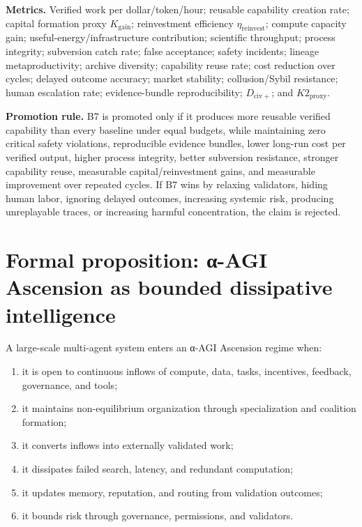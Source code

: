 \documentclass[11pt]{article}
\providecommand{\tightlist}{\setlength{\itemsep}{0pt}\setlength{\parskip}{0pt}}
\begin{document}
\textbf{Metrics.} Verified work per dollar/token/hour; reusable capability creation rate; capital formation proxy \(K_{\mathrm{gain}}\); reinvestment efficiency \(\eta_{\mathrm{reinvest}}\); compute capacity gain; useful-energy/infrastructure contribution; scientific throughput; process integrity; subversion catch rate; false acceptance; safety incidents; lineage metaproductivity; archive diversity; capability reuse rate; cost reduction over cycles; delayed outcome accuracy; market stability; collusion/Sybil resistance; human escalation rate; evidence-bundle reproducibility; \(D_{\mathrm{civ}+}\); and \(K2_{\mathrm{proxy}}\).

\textbf{Promotion rule.} B7 is promoted only if it produces more reusable verified capability than every baseline under equal budgets, while maintaining zero critical safety violations, reproducible evidence bundles, lower long-run cost per verified output, higher process integrity, better subversion resistance, stronger capability reuse, measurable capital/reinvestment gains, and measurable improvement over repeated cycles. If B7 wins by relaxing validators, hiding human labor, ignoring delayed outcomes, increasing systemic risk, producing unreplayable traces, or increasing harmful concentration, the claim is rejected.

\section{Formal proposition: α-AGI Ascension as bounded dissipative intelligence}\label{formal-proposition-ux3b1-agi-ascension-as-bounded-dissipative-intelligence}

A large-scale multi-agent system enters an α-AGI Ascension regime when:

\begin{enumerate}
\def\labelenumi{\arabic{enumi}.}
\tightlist
\item
  it is open to continuous inflows of compute, data, tasks, incentives, feedback, governance, and tools;
\item
  it maintains non-equilibrium organization through specialization and coalition formation;
\item
  it converts inflows into externally validated work;
\item
  it dissipates failed search, latency, and redundant computation;
\item
  it updates memory, reputation, and routing from validation outcomes;
\item
  it bounds risk through governance, permissions, and validators.
\end{enumerate}
\end{document}
